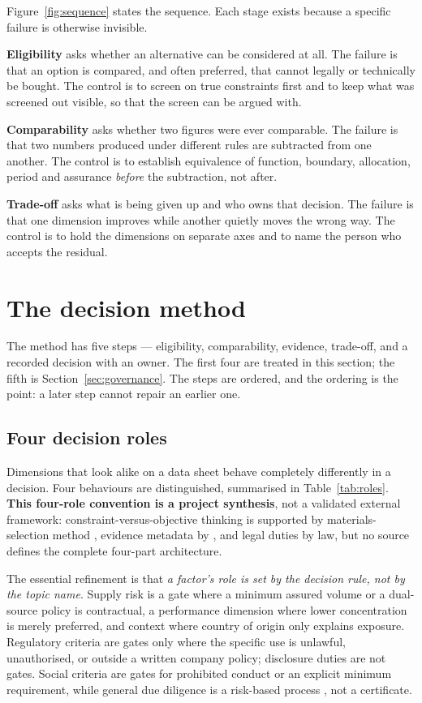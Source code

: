 \documentclass[10pt,twocolumn,a4paper]{article}
\begin{document}
Figure~\ref{fig:sequence} states the sequence. Each stage exists because a
specific failure is otherwise invisible.

\textbf{Eligibility} asks whether an alternative can be considered at all. The
failure is that an option is compared, and often preferred, that cannot legally
or technically be bought. The control is to screen on true constraints first and
to keep what was screened out visible, so that the screen can be argued with.

\textbf{Comparability} asks whether two figures were ever comparable. The failure
is that two numbers produced under different rules are subtracted from one
another. The control is to establish equivalence of function, boundary,
allocation, period and assurance \emph{before} the subtraction, not after.

\textbf{Trade-off} asks what is being given up and who owns that decision. The
failure is that one dimension improves while another quietly moves the wrong way.
The control is to hold the dimensions on separate axes and to name the person who
accepts the residual.

\section{The decision method}

The method has five steps --- eligibility, comparability, evidence, trade-off,
and a recorded decision with an owner. The first four are treated in this
section; the fifth is Section~\ref{sec:governance}. The steps are ordered, and
the ordering is the point: a later step cannot repair an earlier one.

\subsection{Four decision roles}
\label{sec:roles}

Dimensions that look alike on a data sheet behave completely differently in a
decision. Four behaviours are distinguished, summarised in
Table~\ref{tab:roles}. \textbf{This four-role convention is a project synthesis},
not a validated external framework: constraint-versus-objective thinking is
supported by materials-selection method \cite{c6}, evidence metadata by
\cite{a2,p3}, and legal duties by law, but no source defines the complete
four-part architecture.

The essential refinement is that \emph{a factor's role is set by the decision
rule, not by the topic name}. Supply risk is a gate where a minimum assured volume
or a dual-source policy is contractual, a performance dimension where lower
concentration is merely preferred, and context where country of origin only
explains exposure. Regulatory criteria are gates only where the specific use is
unlawful, unauthorised, or outside a written company policy; disclosure duties are
not gates. Social criteria are gates for prohibited conduct or an explicit minimum
requirement, while general due diligence is a risk-based process
\cite{p5,v1,b6}, not a certificate.
\end{document}
